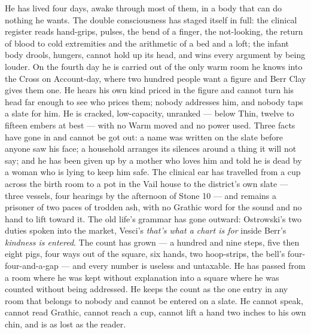 \documentclass{design/chronicle}
\begin{document}
{
He has lived four days, awake through most of them, in a body that can do nothing he wants. The double consciousness has staged itself in full: the clinical register reads hand-grips, pulses, the bend of a finger, the not-looking, the return of blood to cold extremities and the arithmetic of a bed and a loft; the infant body drools, hungers, cannot hold up its head, and wins every argument by being louder. On the fourth day he is carried out of the only warm room he knows into the Cross on Account-day, where two hundred people want a figure and Berr Clay gives them one. He hears his own kind priced in the figure and cannot turn his head far enough to see who prices them; nobody addresses him, and nobody taps a slate for him. He is cracked, low-capacity, unranked --- below Thin, twelve to fifteen embers at best --- with no Warm moved and no power used. Three facts have gone in and cannot be got out: a name was written on the slate before anyone saw his face; a household arranges its silences around a thing it will not say; and he has been given up by a mother who loves him and told he is dead by a woman who is lying to keep him safe. The clinical ear has travelled from a cup across the birth room to a pot in the Vail house to the district’s own slate --- three vessels, four hearings by the afternoon of Stone 10 --- and remains a prisoner of two paces of trodden ash, with no Grathic word for the sound and no hand to lift toward it. The old life’s grammar has gone outward: Ostrowski’s two duties spoken into the market, Vesci’s \emph{that’s what a chart is for} inside Berr’s \emph{kindness is entered}. The count has grown --- a hundred and nine steps, five then eight pigs, four ways out of the square, six hands, two hoop-strips, the bell’s four-four-and-a-gap --- and every number is useless and untaxable. He has passed from a room where he was kept without explanation into a square where he was counted without being addressed. He keeps the count as the one entry in any room that belongs to nobody and cannot be entered on a slate. He cannot speak, cannot read Grathic, cannot reach a cup, cannot lift a hand two inches to his own chin, and is as lost as the reader.

}
\end{document}
